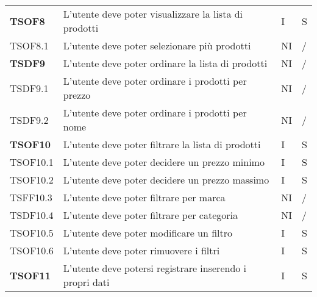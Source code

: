 \begin{center}
\begin{longtable}[!h]{p{60px} p{240px} p{35px} p{35px}}
        \textbf{TSOF8}  & L'utente deve poter visualizzare la lista di prodotti                                               & I              & S              \\
        TSOF8.1         & L'utente deve poter selezionare più prodotti                                                        & NI             & /              \\
        \textbf{TSDF9}  & L'utente deve poter ordinare la lista di prodotti                                                   & NI             & /              \\
        TSDF9.1         & L'utente deve poter ordinare i prodotti per prezzo                                                  & NI             & /              \\
        TSDF9.2         & L'utente deve poter ordinare i prodotti per nome                                                    & NI             & /              \\
        \textbf{TSOF10} & L'utente deve poter filtrare la lista di prodotti                                                   & I              & S              \\
        TSOF10.1        & L'utente deve poter decidere un prezzo minimo                                                       & I              & S              \\
        TSOF10.2        & L'utente deve poter decidere un prezzo massimo                                                      & I              & S              \\
        TSFF10.3        & L'utente deve poter filtrare per marca                                                              & NI             & /              \\
        TSDF10.4        & L'utente deve poter filtrare per categoria                                                          & NI             & /              \\
        TSOF10.5        & L'utente deve poter modificare un filtro                                                            & I              & S              \\
        TSOF10.6        & L'utente deve poter rimuovere i filtri                                                              & I              & S              \\
        \textbf{TSOF11} & L'utente deve potersi registrare inserendo i propri dati                                            & I              & S              \\

\end{longtable}
\end{center}
